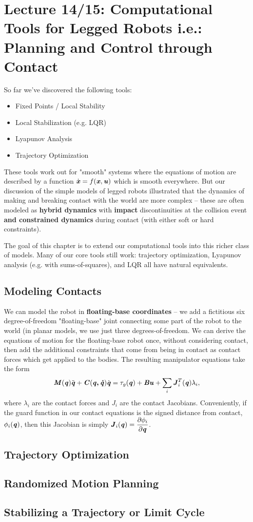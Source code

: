 \chapter{Lecture 14/15: Computational Tools for Legged Robots i.e.: Planning and Control through Contact}
So far we've discovered the following tools:
\begin{itemize}
\item Fixed Points / Local Stability
\item Local Stabilization (e.g. LQR)
\item Lyapunov Analysis
\item Trajectory Optimization
\end{itemize}
These tools work out for "smooth" systems where the equations of motion are described by a function $\dot{\bm{\mathit{x}}}=f(\bm{\mathit{x}},\bm{\mathit{u}})$ which is smooth everywhere. But our discussion of the simple models of legged robots illustrated that the dynamics of making and breaking contact with the world are more complex -- these are often modeled as \textbf{hybrid dynamics} with \textbf{impact} discontinuities at the collision event \textbf{and constrained dynamics} during contact (with either soft or hard constraints).

The goal of this chapter is to extend our computational tools into this richer class of models. Many of our core tools still work: trajectory optimization, Lyapunov analysis (e.g. with sums-of-squares), and LQR all have natural equivalents. 

\section{Modeling Contacts}
We can model the robot in \textbf{floating-base coordinates} -- we add a fictitious six degree-of-freedom "floating-base" joint connecting some part of the robot to the world (in planar models, we use just three degrees-of-freedom. We can derive the equations of motion for the floating-base robot once, without considering contact, then add the additional constraints that come from being in contact as contact forces which get applied to the bodies. The resulting manipulator equations take the form
$$\bm{\mathit{M}}(\bm{\mathit{q}})\ddot{\bm{\mathit{q}}}+\bm{\mathit{C}}(\bm{\mathit{q,\dot{q}}})\dot{\bm{\mathit{q}}}=\tau_g(\bm{\mathit{q}})+\bm{\mathit{Bu}}+\sum_i\bm{\mathit{J}}_i^T(\bm{\mathit{q}})\lambda_i,$$
where $\lambda_i$ are the contact forces and $J_i$ are the contact Jacobians. 
Conveniently, if the guard function in our contact equations is the signed distance from contact, $\phi_i(\bm{\mathit{q}})$, then this Jacobian is simply $\bm{\mathit{J}}_i(\bm{\mathit{q}})=\dfrac{\partial\phi_i}{\partial\bm{\mathit{q}}}$.

\section{Trajectory Optimization}
\section{Randomized Motion Planning}
\section{Stabilizing a Trajectory or Limit Cycle}


